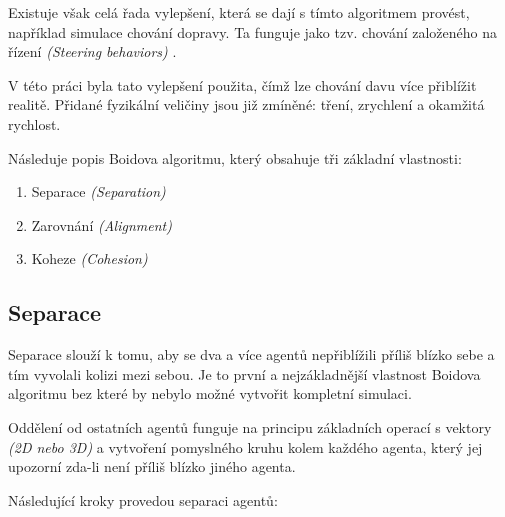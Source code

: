\documentclass[czech,public,dept460,male,cpdeclaration]{diploma}
\begin{document}
Existuje však celá řada vylepšení, která se dají s tímto algoritmem provést, například simulace chování dopravy. Ta funguje jako tzv. chování založeného na řízení \textit{(Steering behaviors)} \cite{linkToSteeringBehaviors}. 

V této práci byla tato vylepšení použita, čímž lze chování davu více přiblížit realitě. Přidané fyzikální veličiny jsou již zmíněné: tření, zrychlení a okamžitá rychlost.

\newpage
Následuje popis Boidova algoritmu, který obsahuje tři základní vlastnosti:

\begin{enumerate}
	\item Separace \textit{(Separation)}
	\item Zarovnání \textit{(Alignment)}
	\item Koheze \textit{(Cohesion)}
\end{enumerate}

\subsection{Separace}\label{sec:separace}
Separace slouží k tomu, aby se dva a více agentů nepřiblížili příliš blízko sebe a tím vyvolali kolizi mezi sebou. Je to první a nejzákladnější vlastnost Boidova algoritmu bez které by nebylo možné vytvořit kompletní simulaci. 

Oddělení od ostatních agentů funguje na principu základních operací s vektory \textit{(2D nebo 3D)} a vytvoření pomyslného kruhu kolem každého agenta, který jej upozorní zda-li není příliš blízko jiného agenta. 

Následující kroky provedou separaci agentů: 
\end{document}
